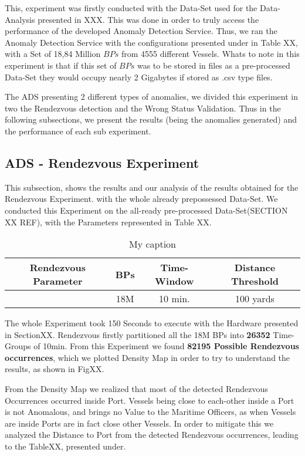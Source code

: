 This, experiment was firstly conducted with the Data-Set used for the Data-Analysis presented in XXX. This was done in order to truly access the performance of the developed Anomaly Detection Service. Thus, we ran the Anomaly Detection Service with the configurations presented under in Table XX, with a Set of 18,84 Million  $BPs$ from 4555 different Vessels. 
Whats to note in this experiment is that if this set of $BPs$ was to be stored in files as a pre-processed Data-Set they would occupy nearly 2 Gigabytes if stored as .csv type files.

The ADS presenting 2 different types of anomalies, we divided this experiment in two the Rendezvous detection and the Wrong Status Validation. Thus in the following subsections, we present the results (being the anomalies generated) and the performance of each sub experiment.


\subsection{ADS - Rendezvous Experiment}
\label{subsection: ADS - Rendezvous Experiment}
This subsection, shows the results and our analysis of the results obtained for the Rendezvous Experiment. with the whole already prepossessed Data-Set.
We conducted this Experiment on the all-ready pre-processed Data-Set(SECTION XX REF), with the Parameters represented in Table XX.

\begin{table}[H]
\centering
\caption{My caption}
\label{my-label}
\begin{tabular}{@{}cccc@{}}
\toprule
Rendezvous Parameter & BPs & Time-Window & Distance Threshold \\ \midrule
                    & 18M & 10 min.     & 100 yards         \\ \bottomrule
\end{tabular}
\end{table}

The whole Experiment took 150 Seconds to execute with the Hardware presented in SectionXX. Rendezvous firstly partitioned all the 18M BPs into \textbf{26352} Time-Groups of 10min. From this Experiment we found \textbf{82195 Possible Rendezvous occurrences}, which we plotted Density Map in order to try to understand the results, as shown in FigXX.


From the Density Map we realized that most of the detected Rendezvous Occurrences occurred inside Port. Vessels being close to each-other inside a Port is not Anomalous, and brings no Value to the Maritime Officers, as when Vessels are inside Ports are in fact close other Vessels. In order to mitigate this we analyzed the Distance to Port from the detected Rendezvous occurrences, leading to the TableXX, presented under.

